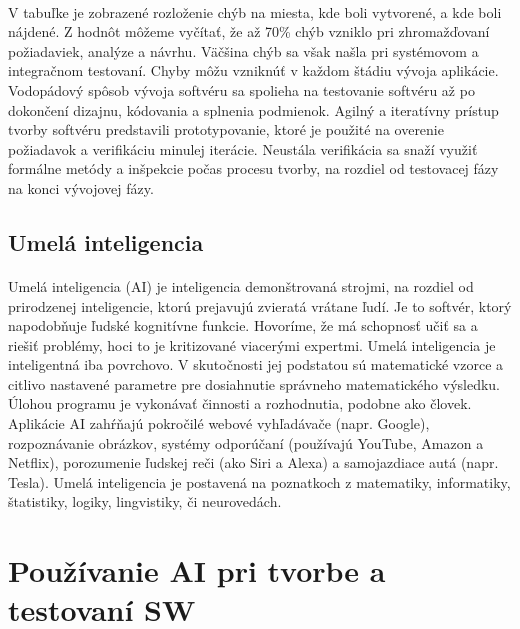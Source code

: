 \documentclass[10pt,twoside,slovak,a4paper]{article}
\begin{document}
\paragraph{}
 V tabuľke je zobrazené rozloženie chýb na miesta, kde boli vytvorené, a kde boli nájdené. Z hodnôt môžeme vyčítať, že až 70\% chýb vzniklo pri zhromažďovaní požiadaviek, analýze a návrhu. Väčšina chýb sa však našla pri systémovom a integračnom testovaní.
 Chyby môžu vzniknúť v každom štádiu vývoja aplikácie. \cite{testovanie}\\ Vodopádový spôsob vývoja softvéru sa spolieha na testovanie softvéru až po dokončení dizajnu, kódovania a splnenia podmienok. Agilný a iteratívny prístup tvorby softvéru predstavili prototypovanie, ktoré je použité na overenie požiadavok a verifikáciu minulej iterácie. Neustála verifikácia sa snaží využiť formálne metódy a inšpekcie počas procesu tvorby, na rozdiel od testovacej fázy na konci vývojovej fázy. \cite{CSEroadmap}
 
\subsection{Umelá inteligencia}\label{AI}
\paragraph{}
 Umelá inteligencia (AI) je inteligencia demonštrovaná strojmi, na rozdiel od prirodzenej inteligencie, ktorú prejavujú zvieratá vrátane ľudí. Je to softvér, ktorý napodobňuje ľudské kognitívne funkcie. Hovoríme, že má schopnosť učiť sa a riešiť problémy, hoci to je kritizované viacerými expertmi. Umelá inteligencia je inteligentná iba povrchovo. V skutočnosti jej podstatou sú matematické vzorce a citlivo nastavené parametre pre dosiahnutie správneho matematického výsledku. Úlohou programu je vykonávať činnosti a rozhodnutia, podobne ako človek.
 Aplikácie AI zahŕňajú pokročilé webové vyhľadávače (napr. Google), rozpoznávanie obrázkov, systémy odporúčaní (používajú YouTube, Amazon a Netflix), porozumenie ľudskej reči (ako Siri a Alexa) a samojazdiace autá (napr. Tesla). Umelá inteligencia je postavená na poznatkoch z matematiky, informatiky, štatistiky, logiky, lingvistiky, či neurovedách. \cite{AIvMed}

\section{Používanie AI pri tvorbe a testovaní SW} \label{pouzitie AI pri SW}
\end{document}
